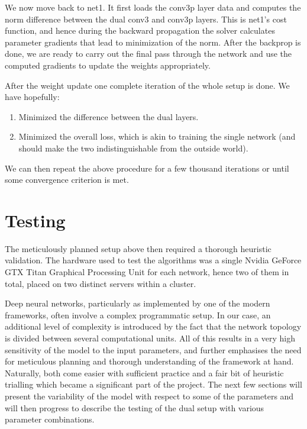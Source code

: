 \documentclass[a4paper, 11pt]{article}
\numberwithin{equation}{section}
\begin{document}
	We now move back to net1. It first loads the conv3p layer data and computes the norm difference between the dual conv3 and conv3p layers. This is net1's cost function, and hence during the backward propagation the solver calculates parameter gradients that lead to minimization of the norm. After the backprop is done, we are ready to carry out the final pass through the network and use the computed gradients to update the weights appropriately.
	
	After the weight update one complete iteration of the whole setup is done. We have hopefully:
	
	\begin{enumerate}
		\item Minimized the difference between the dual layers.
		\item Minimized the overall loss, which is akin to training the single network (and should make the two indistinguishable from the outside world).
	\end{enumerate}
	
	We can then repeat the above procedure for a few thousand iterations or until some convergence criterion is met.
	
	\section{Testing}
	
	The meticulously planned setup above then required a thorough heuristic validation. The hardware used to test the algorithms was a single Nvidia GeForce GTX Titan Graphical Processing Unit for each network, hence two of them in total, placed on two distinct servers within a cluster.
	
	Deep neural networks, particularly as implemented by one of the modern frameworks, often involve a complex programmatic setup. In our case, an additional level of complexity is introduced by the fact that the network topology is divided between several computational units. All of this results in a very high sensitivity of the model to the input parameters, and further emphasises the need for meticulous planning and thorough understanding of the framework at hand. Naturally, both come easier with sufficient practice and a fair bit of heuristic trialling which became a significant part of the project. The next few sections will present the variability of the model with respect to some of the parameters and will then progress to describe the testing of the dual setup with various parameter combinations.
	
\end{document}
